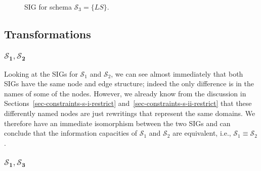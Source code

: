 \documentclass{article}
\newcounter{constraint}
\newcommand{\identifier}[1]{\ensuremath{\mathit{#1}}}
\newcommand{\LS}{\identifier{LS}}
\newcommand{\schema}[1]{\ensuremath{\mathcal{S}_{#1}}}
\newcommand{\Equivalent}[2]{\ensuremath{#1 \equiv #2}}
\begin{document}
\begin{figure*}
    \caption{SIG for schema \(\schema{3} = \{\LS\}\).}
    \label{fig-sig-s-iii-restrict}
\end{figure*}





\subsection{Transformations}
\label{sec-transforming-restrict}




\subsubsection{\(\bm{\schema{1}, \schema{2}}\)}

\noindent Looking at the SIGs for \(\schema{1}\) and \(\schema{2}\), we can see almost immediately that both SIGs have the same node and edge structure; indeed the only difference is in the names of some of the nodes. However, we already know from the discussion in Sections~\ref{sec-constraints-s-i-restrict} and~\ref{sec-constraints-s-ii-restrict} that these differently named nodes are just rewritings that represent the same domains. We therefore have an immediate isomorphism between the two SIGs and can conclude that the information capacities of \(\schema{1}\) and \(\schema{2}\) are equivalent, i.e., \(\Equivalent{\schema{1}}{\schema{2}}\).




\subsubsection{\(\bm{\schema{1}, \schema{3}}\)}
\end{document}
